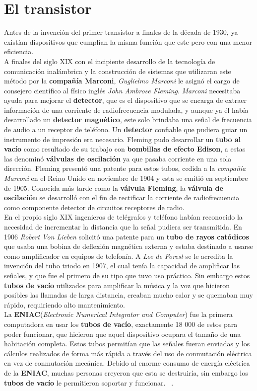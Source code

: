 \chapter{El transistor}\label{chapter:transistor}

Antes de la invención del primer transistor a finales de la década de 1930, ya existían dispositivos que cumplían la misma función que 
este pero con una menor eficiencia.\\
\indent A finales del siglo XIX con el incipiente desarrollo de la tecnología de comunicación inalámbrica y la construcción de sistemas que
utilizaran este método por la \textbf{compañía Marconi}, \emph{Guglielmo Marconi} le asignó el cargo de consejero científico al físico
inglés \emph{John Ambrose Fleming}. \emph{Marconi} necesitaba ayuda para mejorar el \textbf{detector}, que es el
dispositivo que se encarga de extraer información de una corriente de radiofrecuencia modulada, y aunque ya él había desarrollado un
\textbf{detector magnético}, este solo brindaba una señal de frecuencia de audio a un receptor de teléfono. Un \textbf{detector}
confiable que pudiera guiar un instrumento de impresión era necesario. Fleming pudo desarrollar un \textbf{tubo al vacío} como resultado de su 
trabajo con \textbf{bombillas de efecto Edison}, a estas las denominó \textbf{válvulas de oscilación} ya que pasaba corriente en una sola
dirección. Fleming presentó una patente para estos tubos, cedida a la \emph{compañía Marconi} en el Reino Unido en noviembre de 1904 y esta
se emitió en septiembre de 1905. Conocida más tarde como la \textbf{válvula Fleming}, la \textbf{válvula de oscilación} se desarrolló con el
fin de rectificar la corriente de radiofrecuencia como componente detector de circuitos receptores de radio.\\
\indent En el propio siglo XIX ingenieros de telégrafos y teléfono habían reconocido la necesidad de incrementar la distancia que la señal pudiera ser
transmitida. En 1906 \emph{Robert Von Lieben} solicitó una patente para un \textbf{tubo de rayos catódicos} que usaba una bobina de deflexión
magnética externa y estaba destinado a usarse como amplificador en equipos de telefonía. A \emph{Lee de Forest} se le acredita la invención del
tubo triodo en 1907, el cual tenía la capacidad de amplificar las señales, y que fue el primero de su tipo que tuvo uso práctico. Sin embargo estos
\textbf{tubos de vacío} utilizados para amplificar la música y la voz que hicieron posibles las llamadas de larga distancia, creaban mucho calor y
se quemaban muy rápido, requiriendo alto mantenimiento. \textcite{wikipedia_2022_tube, wikipedia_2022_triode}\\
\indent La \textbf{ENIAC}(\emph{Electronic Numerical Integrator and Computer}) fue la primera computadora en usar los \textbf{tubos de vacío}, exactamente
18 000 de estos para poder funcionar, que hicieron que aquel dispositivo ocupara el tamaño de una habitación completa. Estos tubos permitían que las
señales fueran enviadas y los cálculos realizados de forma más rápida a través del uso de conmutación eléctrica en vez de conmutación mecánica. 
Debido al enorme consumo de energía eléctrica de la \textbf{ENIAC}, muchas personas creyeron que esta se destruiría, sin embargo los \textbf
{tubos de vacío} le permitieron soportar y funcionar. ~\textcite{richards_2022}.
